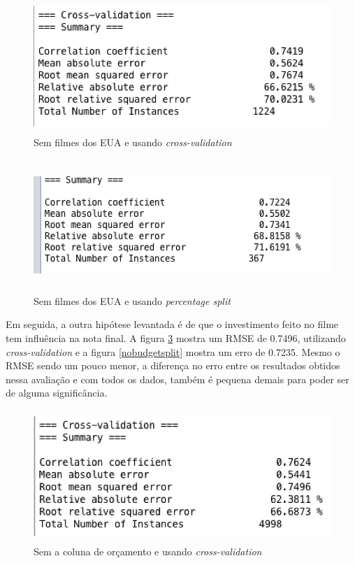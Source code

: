 \begin{figure}[H]
\centering
\includegraphics[height=5cm]{imagens/sem_usa_cv.png}
\caption{Sem filmes dos EUA e usando \textit{cross-validation}}
\label{nousacv}
\end{figure}

\begin{figure}[H]
\centering
\includegraphics[height=5cm]{imagens/sem_usa_split.png}
\caption{Sem filmes dos EUA e usando \textit{percentage split}}
\label{nousasplit}
\end{figure}


Em seguida, a outra hipótese levantada é de que o investimento feito no filme tem influência na nota final. A figura \ref{nobudgetcv} mostra um RMSE de 0.7496, utilizando \textit{cross-validation} e a figura \ref{nobudgetsplit} mostra um erro de 0.7235. Mesmo o RMSE sendo um pouco menor, a diferença no erro entre os resultados obtidos nessa avaliação e com todos os dados, também é pequena demais para poder ser de alguma significância.

\begin{figure}[H]
\centering
\includegraphics[height=5cm]{imagens/no_budget_cv.png}
\caption{Sem a coluna de orçamento e usando \textit{cross-validation}}
\label{nobudgetcv}
\end{figure}

